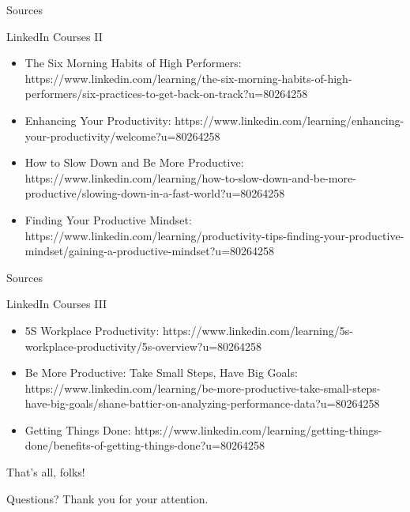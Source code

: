 \begin{frame}{Sources}
  \begin{block}{LinkedIn Courses II}
    \begin{itemize}
      \item The Six Morning Habits of High Performers: https://www.linkedin.com/learning/the-six-morning-habits-of-high-performers/six-practices-to-get-back-on-track?u=80264258
      \item Enhancing Your Productivity: https://www.linkedin.com/learning/enhancing-your-productivity/welcome?u=80264258
      \item How to Slow Down and Be More Productive: https://www.linkedin.com/learning/how-to-slow-down-and-be-more-productive/slowing-down-in-a-fast-world?u=80264258
      \item Finding Your Productive Mindset: https://www.linkedin.com/learning/productivity-tips-finding-your-productive-mindset/gaining-a-productive-mindset?u=80264258
    \end{itemize}
  \end{block}
\end{frame}

\begin{frame}{Sources}
  \begin{block}{LinkedIn Courses III}
    \begin{itemize}
      \item 5S Workplace Productivity: https://www.linkedin.com/learning/5s-workplace-productivity/5s-overview?u=80264258
      \item Be More Productive: Take Small Steps, Have Big Goals: https://www.linkedin.com/learning/be-more-productive-take-small-steps-have-big-goals/shane-battier-on-analyzing-performance-data?u=80264258
      \item Getting Things Done: https://www.linkedin.com/learning/getting-things-done/benefits-of-getting-things-done?u=80264258
    \end{itemize}
  \end{block}
\end{frame}

\begin{frame}{That's all, folks!}
  \begin{block}{Questions?}
    Thank you for your attention. 
  \end{block}
\end{frame}

